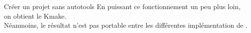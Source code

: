 \begin{frame}[fragile=singleslide]{Créer un projet sans autotools}
  En puissant ce fonctionnement un peu plus loin, on obtient le Kmake.\\[2ex]

  Néanmoins,  le résultat  n'est  pas portable  entre les  différentes
  implémentation de .
\end{frame}


